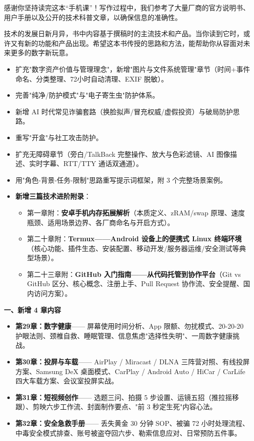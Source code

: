 
感谢你坚持读完这本“手机课”！写作过程中，我们参考了大量厂商的官方说明书、用户手册以及公开的技术科普文章，以确保信息的准确性。

技术的发展日新月异，书中内容基于撰稿时的主流技术和产品。当你读到它时，或许又有新的功能和产品出现。希望这本书传授的思路和方法，能帮助你从容面对未来更多的数字新玩意。


\begin{itemize}
  \item 扩充"数字资产价值与管理理念"，新增"图片与文件系统管理"章节（时间+事件命名、分类整理、72小时自动清理、EXIF 脱敏）。
  \item 完善"纯净/防护模式"与"电子寄生虫"防护体系。
  \item 新增 AI 时代常见诈骗套路（换脸拟声/冒充权威/虚假投资）与破局防护思路。
  \item 重写"开盒"与社工攻击防护。
  \item 扩充无障碍章节（旁白/TalkBack 完整操作、放大与色彩滤镜、AI 图像描述、实时字幕、RTT/TTY 通话双通道）。
  \item 用"角色-背景-任务-限制"思路重写提示词框架，附 3 个完整场景案例。
  \item \textbf{新增三篇技术进阶附录}：
  \begin{itemize}
    \item 第一章附：\textbf{安卓手机内存拓展解析}（本质定义、zRAM/swap 原理、速度瓶颈、适用场景边界、各厂商命名与开启方式）。
    \item 第二十章附：\textbf{Termux——Android 设备上的便携式 Linux 终端环境}（核心功能、插件生态、安装配置、移动开发/服务器运维/安全测试等典型场景）。
    \item 第二十三章附：\textbf{GitHub 入门指南——从代码托管到协作平台}（Git vs GitHub 区分、核心概念、注册上手、Pull Request 协作流、安全提醒、国内访问方案）。
  \end{itemize}
\end{itemize}


\textbf{一、新增 4 章内容}

\begin{itemize}
  \item \textbf{第29章：数字健康}—— 屏幕使用时间分析、App 限额、勿扰模式、20-20-20 护眼法则、颈椎自救、睡眠管理、信息焦虑"选择性失明"、一周数字健康挑战。
  \item \textbf{第30章：投屏与车载}—— AirPlay / Miracast / DLNA 三阵营对照、有线投屏方案、Samsung DeX 桌面模式、CarPlay / Android Auto / HiCar / CarLife 四大车载方案、会议室投屏实战。
  \item \textbf{第31章：短视频创作}—— 选题三问、拍摄 5 步设置、运镜五招（推拉摇移跟）、剪映六步工作流、封面制作要点、"前 3 秒定生死"内容心法。
  \item \textbf{第32章：安全急救手册}—— 丢失黄金 30 分钟 SOP、被骗 72 小时处理流程、中毒安全模式排查、账号被盗夺回六步、勒索信息应对、日常预防五件事。
\end{itemize}

